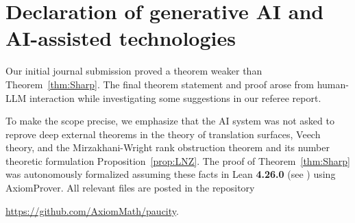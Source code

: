\documentclass[12pt]{amsart}
\theoremstyle{definition}
\begin{document}
\section*{Declaration of generative AI and AI-assisted technologies}\label{sec:AxiomProver}


Our initial journal submission proved a theorem weaker than Theorem~\ref{thm:Sharp}.  The final theorem statement and proof arose from human-LLM interaction while investigating some suggestions in our referee report. 

To make the scope precise, we emphasize that the AI system was not asked to reprove deep external
theorems in the theory of translation surfaces, Veech theory,
and the Mirzakhani-Wright rank obstruction theorem and its number theoretic
formulation Proposition~\ref{prop:LNZ}. 
The proof of Theorem~\ref{thm:Sharp} was autonomously formalized assuming these facts in Lean \textbf{4.26.0} (see \cite{Mathlib2020, Lean}) using AxiomProver.  All relevant files are posted in the repository  
\begin{center}
\url{https://github.com/AxiomMath/paucity}.
\end{center}
\end{document}
